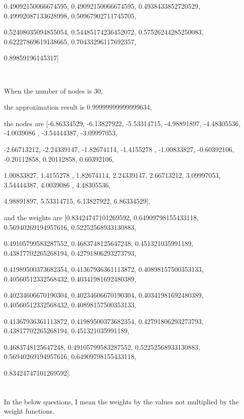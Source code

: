 \documentclass{article}
\begin{document}
 0.49092150066674595,
 0.49092150066674595,
 0.4938433852720529,
 0.49992087133628998,
 0.50967902711745705,\par
 0.52408035094855054,
 0.54485174236452072,
 0.57526244285250083,
 0.62227869619138665,
 0.70433296117692357,\par
 0.89859196145317] \par
 		\ 
		\par
 		When the number of nodes is 30, \par
		the approximation result is 0.99999999999999634, \par
		the nodes are [-6.86334529, -6.13827922, -5.53314715, -4.98891897, -4.48305536,
        -4.0039086 , -3.54444387, -3.09997053, \par-2.66713212, -2.24339147,
        -1.82674114, -1.4155278 , -1.00833827, -0.60392106, -0.20112858,
         0.20112858,  0.60392106, \par 1.00833827,  1.4155278 ,  1.82674114,
         2.24339147,  2.66713212,  3.09997053,  3.54444387,  4.0039086 ,
         4.48305536,  \par 4.98891897,  5.53314715,  6.13827922,  6.86334529], \par
         and the weights are [0.83424747101269592,
 0.64909798155433118,
 0.56940269194957616,
 0.52252568933130883,\par
 0.49105799583287552,
 0.4683748125647248,
 0.451321035991189,
 0.43817702265268194,
 0.42791806293273793,\par
 0.41989500373682354,
 0.41367936361113872,
 0.40898157500353133,
 0.40560512332568432,
 0.40341981692480389,\par
 0.40234606670190304,
 0.40234606670190304,
 0.40341981692480389,
 0.40560512332568432,
 0.40898157500353133,\par
 0.41367936361113872,
 0.41989500373682354,
 0.42791806293273793,
 0.43817702265268194,
 0.451321035991189,\par
 0.4683748125647248,
 0.49105799583287552,
 0.52252568933130883,
 0.56940269194957616,
 0.64909798155433118,\par
 0.83424747101269592]. \par
         
\section{}
	
	In the below questions, I mean the weights by the values not multiplied by the weight functions.
\end{document}

